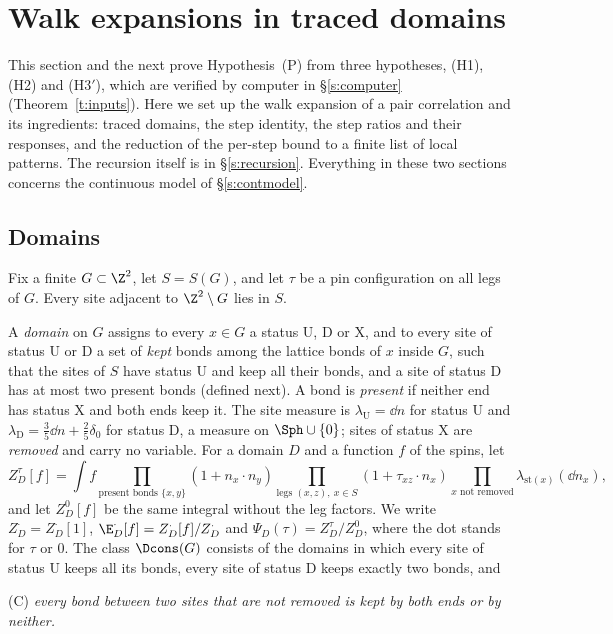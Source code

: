 \section{Walk expansions in traced domains}\label{s:walks}

This section and the next prove Hypothesis~(P) from three hypotheses, (H1), (H2) and (H3$'$), which are verified by computer in \S\ref{s:computer} (Theorem~\ref{t:inputs}). Here we set up the walk expansion of a pair correlation and its ingredients: traced domains, the step identity, the step ratios and their responses, and the reduction of the per-step bound to a finite list of local patterns. The recursion itself is in \S\ref{s:recursion}. Everything in these two sections concerns the continuous model of \S\ref{s:contmodel}.

\subsection{Domains}\label{s:domains}

Fix a finite $G \subset \Z^2$, let $S = S(G)$, and let $\tau$ be a pin configuration on all legs of $G$. Every site adjacent to $\Z^2 \setminus G$ lies in $S$.

\begin{definition}\label{d:domain}
A \emph{domain} on $G$ assigns to every $x \in G$ a status $\mathrm{U}$, $\mathrm{D}$ or $\mathrm{X}$, and to every site of status $\mathrm U$ or $\mathrm D$ a set of \emph{kept} bonds among the lattice bonds of $x$ inside $G$, such that the sites of $S$ have status $\mathrm U$ and keep all their bonds, and a site of status $\mathrm D$ has at most two present bonds (defined next). A bond is \emph{present} if neither end has status $\mathrm X$ and both ends keep it. The site measure is $\lambda_{\mathrm U} = \dd n$ for status $\mathrm U$ and $\lambda_{\mathrm D} = \frac35 \dd n + \frac25 \delta_0$ for status $\mathrm D$, a measure on $\Sph \cup \{0\}$; sites of status $\mathrm X$ are \emph{removed} and carry no variable. For a domain $D$ and a function $f$ of the spins, let
\begin{equation}\label{e:ZD}
Z^\tau_D[f] = \int f \prod_{\text{present bonds } \{x, y\}} (1 + n_x \cdot n_y) \prod_{\text{legs } (x, z), \ x \in S} (1 + \tau_{xz} \cdot n_x) \prod_{x \text{ not removed}} \lambda_{\mathrm{st}(x)}(\dd n_x),
\end{equation}
and let $Z^0_D[f]$ be the same integral without the leg factors. We write $Z^\cdot_D = Z^\cdot_D[1]$, $\E^\cdot_D[f] = Z^\cdot_D[f] / Z^\cdot_D$ and $\Psi_D(\tau) = Z^\tau_D / Z^0_D$, where the dot stands for $\tau$ or $0$. The class $\Dcons(G)$ consists of the domains in which every site of status $\mathrm U$ keeps all its bonds, every site of status $\mathrm D$ keeps exactly two bonds, and

(C) \emph{every bond between two sites that are not removed is kept by both ends or by neither.}
\end{definition}


